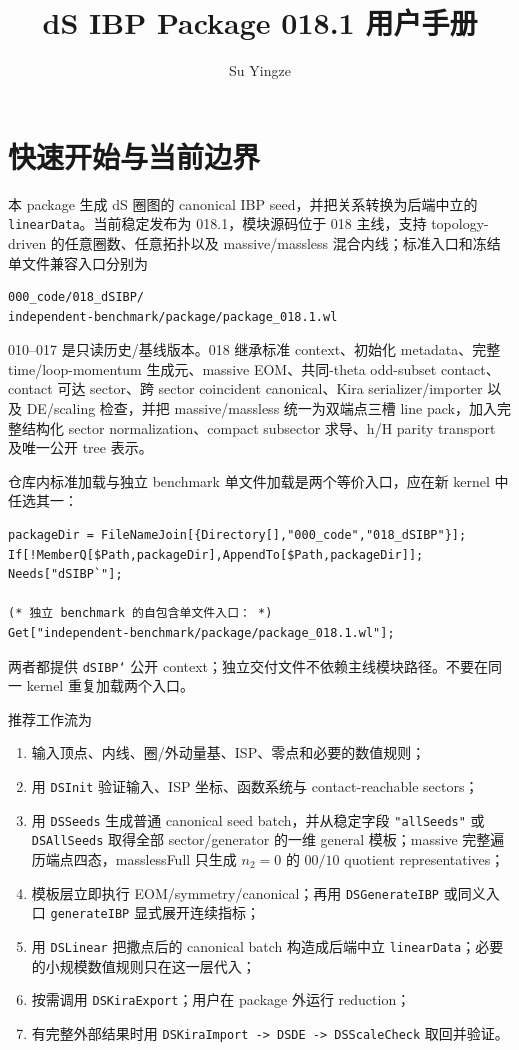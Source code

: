 ﻿\documentclass[a4paper,11pt]{article}
\title{dS IBP Package 018.1 用户手册}
\author[a]{Su Yingze}
\affiliation[a]{Institute not specified}
\begin{document}
\sloppy
\setcounter{tocdepth}{1}
\maketitle
\newpage

\section{快速开始与当前边界}

本 package 生成 dS 圈图的 canonical IBP seed，并把关系转换为后端中立的 \texttt{linearData}。当前稳定发布为 018.1，模块源码位于 018 主线，支持 topology-driven 的任意圈数、任意拓扑以及 massive/massless 混合内线；标准入口和冻结单文件兼容入口分别为
\begin{verbatim}
000_code/018_dSIBP/
independent-benchmark/package/package_018.1.wl
\end{verbatim}
010--017 是只读历史/基线版本。018 继承标准 context、初始化 metadata、完整 time/loop-momentum 生成元、massive EOM、共同-theta odd-subset contact、contact 可达 sector、跨 sector coincident canonical、Kira serializer/importer 以及 DE/scaling 检查，并把 massive/massless 统一为双端点三槽 line pack，加入完整结构化 sector normalization、compact subsector 求导、h/H parity transport 及唯一公开 tree 表示。

仓库内标准加载与独立 benchmark 单文件加载是两个等价入口，应在新 kernel 中任选其一：
\begin{verbatim}
packageDir = FileNameJoin[{Directory[],"000_code","018_dSIBP"}];
If[!MemberQ[$Path,packageDir],AppendTo[$Path,packageDir]];
Needs["dSIBP`"];

(* 独立 benchmark 的自包含单文件入口： *)
Get["independent-benchmark/package/package_018.1.wl"];
\end{verbatim}
两者都提供 \texttt{dSIBP`} 公开 context；独立交付文件不依赖主线模块路径。不要在同一 kernel 重复加载两个入口。

推荐工作流为
\begin{enumerate}
  \item 输入顶点、内线、圈/外动量基、ISP、零点和必要的数值规则；
  \item 用 \texttt{DSInit} 验证输入、ISP 坐标、函数系统与 contact-reachable sectors；
  \item 用 \texttt{DSSeeds} 生成普通 canonical seed batch，并从稳定字段 \texttt{"allSeeds"} 或 \texttt{DSAllSeeds} 取得全部 sector/generator 的一维 general 模板；massive 完整遍历端点四态，masslessFull 只生成 $n_2=0$ 的 $00/10$ quotient representatives；
  \item 模板层立即执行 EOM/symmetry/canonical；再用 \texttt{DSGenerateIBP} 或同义入口 \texttt{generateIBP} 显式展开连续指标；
  \item 用 \texttt{DSLinear} 把撒点后的 canonical batch 构造成后端中立 \texttt{linearData}；必要的小规模数值规则只在这一层代入；
  \item 按需调用 \texttt{DSKiraExport}；用户在 package 外运行 reduction；
  \item 有完整外部结果时用 \texttt{DSKiraImport -> DSDE -> DSScaleCheck} 取回并验证。
\end{enumerate}
\end{document}

